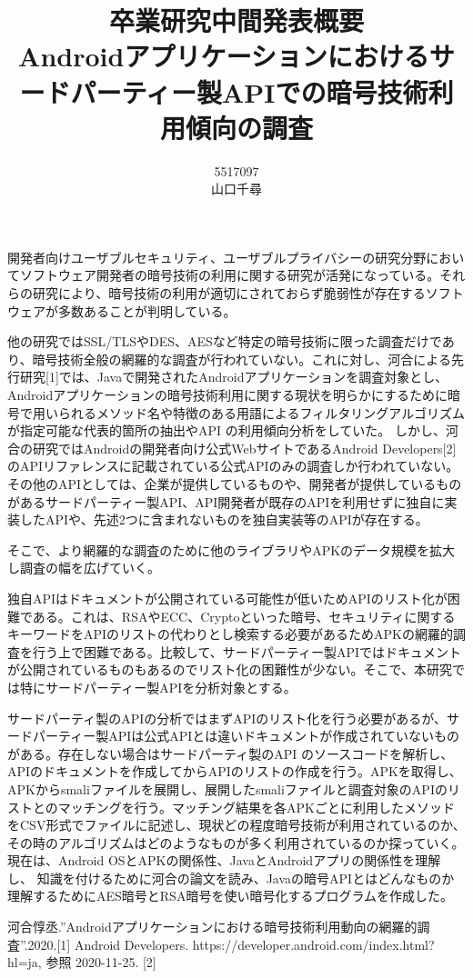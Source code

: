 \documentclass[twocolumn, 10pt, a4paper]{jarticle}
\title{\vspace{-3cm}
{\large 卒業研究中間発表概要}\\
{\bf
Androidアプリケーションにおけるサードパーティー製APIでの暗号技術利用傾向の調査
}
}
\author{
5517097 \\		%
山口千尋		%
}
\date{}
\begin{document}
\maketitle
\thispagestyle{empty}

開発者向けユーザブルセキュリティ、ユーザブルプライバシーの研究分野においてソフトウェア開発者の暗号技術の利用に関する研究が活発になっている。それらの研究により、暗号技術の利用が適切にされておらず脆弱性が存在するソフトウェアが多数あることが判明している。

他の研究ではSSL/TLSやDES、AESなど特定の暗号技術に限った調査だけであり、暗号技術全般の網羅的な調査が行われていない。これに対し、河合による先行研究[1]では、Javaで開発されたAndroidアプリケーションを調査対象とし、Androidアプリケーションの暗号技術利用に関する現状を明らかにするために暗号で用いられるメソッド名や特徴のある用語によるフィルタリングアルゴリズムが指定可能な代表的箇所の抽出やAPI の利用傾向分析をしていた。
しかし、河合の研究ではAndroidの開発者向け公式WebサイトであるAndroid Developers[2]のAPIリファレンスに記載されている公式APIのみの調査しか行われていない。その他のAPIとしては、企業が提供しているものや、開発者が提供しているものがあるサードパーティー製API、API開発者が既存のAPIを利用せずに独自に実装したAPIや、先述2つに含まれないものを独自実装等のAPIが存在する。

そこで、より網羅的な調査のために他のライブラリやAPKのデータ規模を拡大し調査の幅を広げていく。

独自APIはドキュメントが公開されている可能性が低いためAPIのリスト化が困難である。これは、RSAやECC、Cryptoといった暗号、セキュリティに関するキーワードをAPIのリストの代わりとし検索する必要があるためAPKの網羅的調査を行う上で困難である。比較して、サードパーティー製APIではドキュメントが公開されているものもあるのでリスト化の困難性が少ない。そこで、本研究では特にサードパーティー製APIを分析対象とする。

サードパーティ製のAPIの分析ではまずAPIのリスト化を行う必要があるが、サードパーティー製APIは公式APIとは違いドキュメントが作成されていないものがある。存在しない場合はサードパーティ製のAPI のソースコードを解析し、APIのドキュメントを作成してからAPIのリストの作成を行う。APKを取得し、APKからsmaliファイルを展開し、展開したsmaliファイルと調査対象のAPIのリストとのマッチングを行う。マッチング結果を各APKごとに利用したメソッドをCSV形式でファイルに記述し、現状どの程度暗号技術が利用されているのか、その時のアルゴリズムはどのようなものが多く利用されているのか探っていく。
現在は、Android OSとAPKの関係性、JavaとAndroidアプリの関係性を理解し、 知識を付けるために河合の論文を読み、Javaの暗号APIとはどんなものか理解するためにAES暗号とRSA暗号を使い暗号化するプログラムを作成した。







\begin{thebibliography}{10}
河合惇丞.''Androidアプリケーションにおける暗号技術利用動向の網羅的調査''.2020.[1]
Android Developers. 
https://developer.android.com/index.html?hl=ja, 参照 2020-11-25. [2]
\end{thebibliography}
\end{document}
